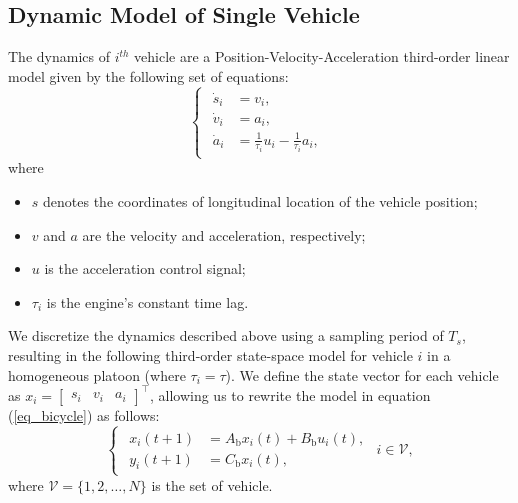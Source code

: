\documentclass[letterpaper, 10pt, conference]{ieeeconf}  %
\def\eqref#1{(\ref{#1})}
\def\V{\mathcal{V}} %
\begin{document}
\subsection{Dynamic Model of Single Vehicle}
The dynamics of $i^{th}$ vehicle are a Position-Velocity-Acceleration third-order linear model given by the following set of equations:
\begin{equation}
\begin{cases}
    \begin{aligned} 
    \dot{s}_i &= v_i,  \\  
    \dot{v}_i &= a_i, \\ 
    \dot{a}_i &= \frac{1}{\tau_i}u_i - \frac{1}{\tau_i}a_i,
\end{aligned}
\end{cases}
\label{eq_bicycle}
\end{equation}
where
\begin{itemize}
    \item ${s}$ denotes the coordinates of longitudinal location of the vehicle position;
    \item $v$ and $a$ are the velocity and acceleration, respectively;
    \item $u$ is the acceleration control signal; 
    \item $\tau_i$ is the engine's constant time lag.
\end{itemize}
We discretize the dynamics described above using a sampling period of \( T_s \), resulting in the following third-order state-space model for vehicle \( i \) in a homogeneous platoon (where \( \tau_i = \tau \)). We define the state vector for each vehicle as $x_i = \begin{bmatrix} s_i & v_i & a_i \end{bmatrix}^{\top}$, allowing us to rewrite the model in equation \eqref{eq_bicycle} as follows:
\begin{equation}
\begin{cases}
    \begin{aligned}
        x_i(t+1) &= A_{\text{b}} x_i(t) + B_{\text{b}}u_{i}(t), \\
        y_{i}(t+1) &= C_{\text{b}} x_i(t),
    \end{aligned}
\end{cases} i \in \V,
\end{equation}
where $\V = \{1, 2, \dots, N\}$ is the set of vehicle.
\end{document}
